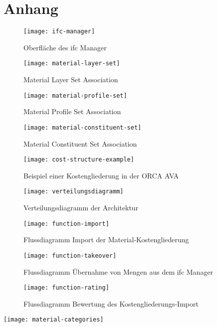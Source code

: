 \chapter{Anhang}
\label{a:append}

\begin{figure}[h]
	\centering
	\texttt{[image: ifc-manager]}
	\caption[IFC Manager]{Oberfläche des \ac{ifc} Manager}
	\label{fig:ifc-manager}
\end{figure}

\begin{figure}[h]
	\centering
	\texttt{[image: material-layer-set]}
	\caption[IfcMaterialLayerSet]{Material Layer Set Association}
	\label{fig:layer-set}
\end{figure}

\begin{figure}[h]
	\centering
	\texttt{[image: material-profile-set]}
	\caption[IfcMaterialProfileSet]{Material Profile Set Association}
	\label{fig:profile-set}
\end{figure}

\begin{figure}[h]
	\centering
	\texttt{[image: material-constituent-set]}
	\caption[IfcMaterialConsituentSet]{Material Constituent Set Association}
	\label{fig:constituent-set}
\end{figure}

\begin{figure}[h]
	\centering
	\texttt{[image: cost-structure-example]}
	\caption[CostStructure]{Beispiel einer Kostengliederung in der ORCA AVA}
	\label{fig:cost-structure}
\end{figure}

\begin{figure}[h]
	\centering
	\texttt{[image: verteilungsdiagramm]}
	\caption[Verteilungsdiagramm]{Verteilungsdiagramm der Architektur}
	\label{fig:distribution-diagramm}
\end{figure}

\begin{figure}[h]
	\centering
	\texttt{[image: function-import]}
	\caption[Import]{Flussdiagramm Import der Material-Kostengliederung}
	\label{fig:func-import}
\end{figure}

\begin{figure}[h]
	\centering
	\texttt{[image: function-takeover]}
	\caption[Takeover]{Flussdiagramm Übernahme von Mengen aus dem \ac{ifc} Manager}
	\label{fig:func-takeover}
\end{figure}

\begin{figure}[h]
	\centering
	\texttt{[image: function-rating]}
	\caption[Rating]{Flussdiagramm Bewertung des Kostengliederungs-Import}
	\label{fig:func-rating}
\end{figure}

\begin{sidewaysfigure}[h]
	\centering
	\texttt{[image: material-categories]}
	\caption[MaterialCategories]{}
	\label{fig:material-categories}
\end{sidewaysfigure}